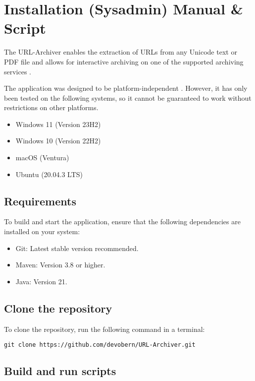 
\section{Installation (Sysadmin) Manual \& Script} \label{sec::installation_manual}
The URL-Archiver enables the extraction of URLs from any Unicode text or PDF file and allows for interactive archiving
on one of the supported archiving services .
\begin{bfhWarnBox}
The application was designed to be platform-independent . However, it has only been tested on the following systems, so it cannot be guaranteed to work without restrictions on other platforms.
\begin{itemize}
	\item Windows 11 (Version 23H2)
	\item Windows 10 (Version 22H2)
	\item macOS (Ventura)
	\item Ubuntu (20.04.3 LTS)
\end{itemize}
\end{bfhWarnBox}

\subsection{Requirements}

To build and start the application, ensure that the following dependencies are installed on your system:
\begin{itemize}
	\item Git: Latest stable version recommended.
	\item Maven: Version 3.8 or higher.
	\item Java: Version 21.
\end{itemize}

\subsection{Clone the repository}

To clone the repository, run the following command in a terminal:

\begin{lstlisting}[numbers=none]
git clone https://github.com/devobern/URL-Archiver.git
\end{lstlisting}

\subsection{Build and run scripts}

